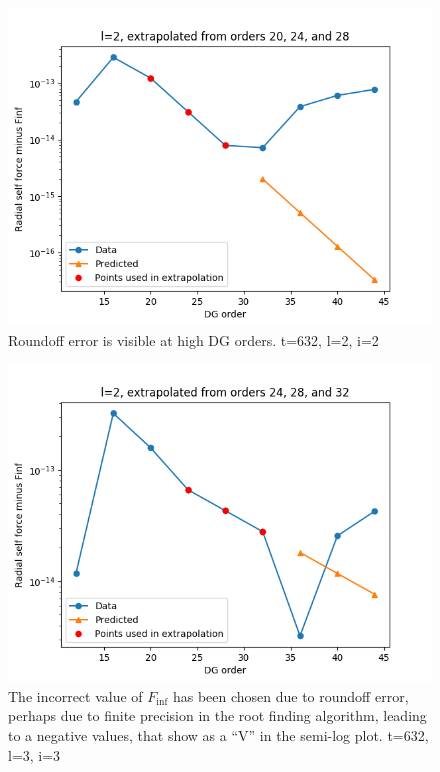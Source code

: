 \begin{figure}
  \includegraphics{extrapolate7t632l2i2}
  \caption{Roundoff error is visible at high DG orders. t=632, l=2, i=2}
  \label{roundoff}
\end{figure}

\begin{figure}
  \includegraphics{extrapolate7t632l2i3}
  \caption{The incorrect value of $F_{\inf}$ has been chosen due to roundoff error, perhaps due to finite precision in the root finding algorithm, leading to a negative values, that show as a ``V'' in the semi-log plot. t=632, l=3, i=3}
  \label{offset}
\end{figure}


